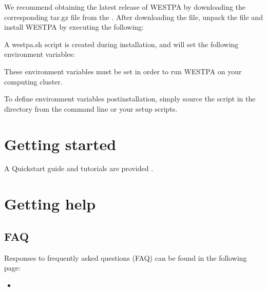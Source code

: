 \documentclass[letterpaper,10pt,english]{sphinxmanual}
\begin{document}
We recommend obtaining the latest release of WESTPA by downloading the corresponding tar.gz file from the . After downloading the file, unpack the file and install WESTPA by executing the following:

\begin{sphinxVerbatim}[commandchars=\\\{\}]
  
 
\end{sphinxVerbatim}

A westpa.sh script is created during installation, and will set the following environment variables:

\begin{sphinxVerbatim}[commandchars=\\\{\}]
\end{sphinxVerbatim}

These environment variables must be set in order to run WESTPA on your computing cluster.

To define environment variables post\sphinxhyphen{}installation, simply source the
 script in the  directory from the command line
or your setup scripts.


\chapter{Getting started}
\label{\detokenize{sphinx_index:getting-started}}
A Quickstart guide and tutorials are provided .


\chapter{Getting help}
\label{\detokenize{sphinx_index:getting-help}}

\section{FAQ}
\label{\detokenize{sphinx_index:faq}}
Responses to frequently asked questions (FAQ) can be found in the following page:
\begin{itemize}
\item {} 

\end{itemize}
\end{document}
